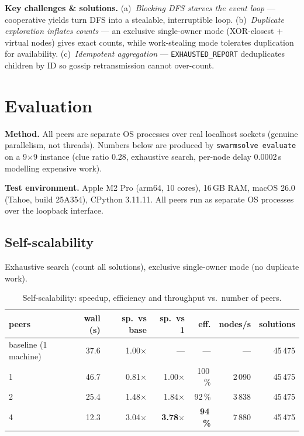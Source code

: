 \documentclass[11pt,a4paper]{article}
\newcommand{\code}[1]{\texttt{#1}}
\begin{document}
\textbf{Key challenges \& solutions.} (a)~\emph{Blocking DFS starves the event loop} ---
cooperative yields turn DFS into a stealable, interruptible loop. (b)~\emph{Duplicate exploration
inflates counts} --- an exclusive single-owner mode (XOR-closest + virtual nodes) gives exact
counts, while work-stealing mode tolerates duplication for availability. (c)~\emph{Idempotent
aggregation} --- \code{EXHAUSTED\_REPORT} deduplicates children by ID so gossip retransmission
cannot over-count.

\section{Evaluation}\label{sec:eval}

\textbf{Method.} All peers are separate OS processes over real localhost sockets (genuine
parallelism, not threads). Numbers below are produced by \code{swarmsolve evaluate} on a
9$\times$9 instance (clue ratio 0.28, exhaustive search, per-node delay 0.0002\,s modelling
expensive work).

\textbf{Test environment.} Apple M2 Pro (arm64, 10 cores), 16\,GB RAM, macOS 26.0 (Tahoe, build
25A354), CPython 3.11.11. All peers run as separate OS processes over the loopback interface.

\subsection{Self-scalability}
Exhaustive search (count all solutions), exclusive single-owner mode (no duplicate work).

\begin{table}[htbp]
  \centering
  \caption{Self-scalability: speedup, efficiency and throughput vs.\ number of peers.}
  \small
  \begin{tabular}{@{}l r r r r r r@{}}
    \toprule
    \textbf{peers} & \textbf{wall (s)} & \textbf{sp.\ vs base} & \textbf{sp.\ vs 1} & \textbf{eff.} & \textbf{nodes/s} & \textbf{solutions}\\
    \midrule
    baseline (1 machine) & 37.6 & 1.00$\times$ & --- & --- & --- & 45\,475\\
    1 & 46.7 & 0.81$\times$ & 1.00$\times$ & 100\,\% & 2\,090 & 45\,475\\
    2 & 25.4 & 1.48$\times$ & 1.84$\times$ & 92\,\% & 3\,838 & 45\,475\\
    4 & 12.3 & 3.04$\times$ & \textbf{3.78$\times$} & \textbf{94\,\%} & 7\,880 & 45\,475\\
    \bottomrule
  \end{tabular}
\end{table}
\end{document}
